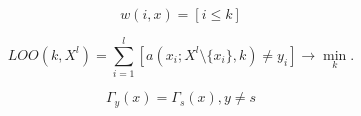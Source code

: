 \documentclass{article}
\begin{document}
$$w(i,x) = [i \leq k]$$

$$ LOO(k, X^l )= \sum_{i=1}^{l} \left [  a(x_i; X^l\setminus \lbrace x_i \rbrace , k) \neq y_i  \right ] \rightarrow \min_k . $$

$$ \Gamma_y(x) = \Gamma_s(x),  y\neq s $$
\end{document}
